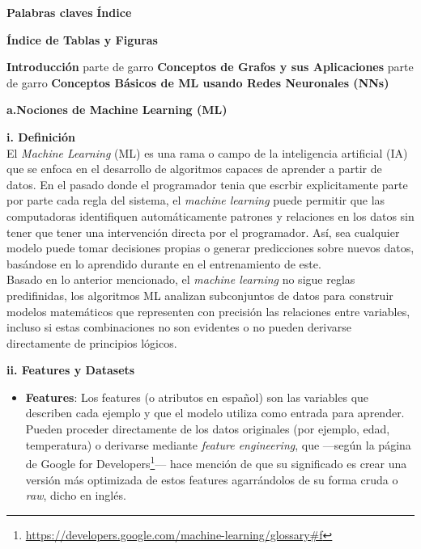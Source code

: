 \documentclass[11pt]{article} %
\begin{document}
\newpage
\thispagestyle{empty}
{\large \textbf{Palabras claves}}
\vspace{5pt}
\newpage
\thispagestyle{empty}
{\large \textbf{Índice}}
\vspace{5pt}

\newpage
\thispagestyle{empty}
{\large \textbf{Índice de Tablas y Figuras}}
\vspace{5pt}

\newpage
\thispagestyle{empty}
{\large \textbf{Introducción}}
\vspace{5pt}
parte de garro
\newpage
\thispagestyle{empty}
{\large \textbf{Conceptos de Grafos y sus Aplicaciones}}
\vspace{5pt}
parte de garro
\newpage
\thispagestyle{empty}
{\large \textbf{Conceptos Básicos de ML usando Redes Neuronales (NNs)}} \vspace{10pt}

\textbf{a.Nociones de Machine Learning (ML)}
\vspace{5pt}

\textbf{i. Definición} 
\vspace{3pt}
\\[1pt]
El \textit{Machine Learning} (ML) es una rama o campo de la inteligencia artificial (IA) que se enfoca en el desarrollo de algoritmos capaces de aprender a partir de datos. En el pasado donde el programador tenia que escrbir explicitamente parte por parte cada regla del sistema, el \textit{machine learning} puede permitir que las computadoras identifiquen automáticamente patrones y relaciones en los datos sin tener que tener una intervención directa por el programador. Así, sea cualquier modelo puede tomar decisiones propias o generar predicciones sobre nuevos datos, basándose en lo aprendido durante en el entrenamiento de este. \\[3pt]
Basado en lo anterior mencionado, el \textit{machine learning} no sigue reglas predifinidas, los algoritmos ML analizan subconjuntos de datos para construir modelos matemáticos que representen con precisión las relaciones entre variables, incluso si estas combinaciones no son evidentes o no pueden derivarse directamente de principios lógicos.

\vspace{8pt}
\textbf{ii. Features y Datasets}\vspace{2pt}
\begin{itemize}
    \item \textbf{Features}: Los features (o atributos en español) son las variables que describen cada ejemplo y que el modelo utiliza como entrada para aprender. 
    Pueden proceder directamente de los datos originales (por ejemplo, edad, temperatura) o derivarse mediante \textit{feature engineering}, que —según la página de Google for Developers\footnote{\url{https://developers.google.com/machine-learning/glossary\#f}}— hace mención de que su significado es crear una versión más optimizada de estos features agarrándolos de su forma cruda o \textit{raw}, dicho en inglés.
\end{itemize}
\end{document}
